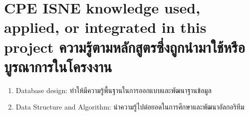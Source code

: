 
\section{\ifenglish%
\ifcpe CPE \else ISNE \fi knowledge used, applied, or integrated in this project
\else%
ความรู้ตามหลักสูตรซึ่งถูกนำมาใช้หรือบูรณาการในโครงงาน
\fi
}
\begin{enumerate}
  \item Database design: ทำให้มีความรู้พื้นฐานในการออกแบบและพัฒนาฐานข้อมูล
  \item Data Structure and Algorithm: นำความรู้ไปต่อยอดในการศึกษาและพัฒนาอัลกอริทึม
\end{enumerate}



